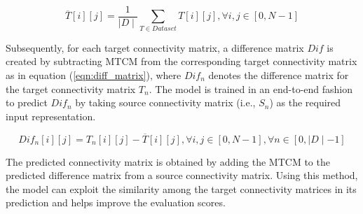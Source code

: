 
\vspace*{-\baselineskip}
\begin{equation}
\overline{T}[i][j]=\frac{1}{\mid D\mid}\sum_{T\in Dataset}T[i][j],\forall i,j\in[0,N-1]
\label{eqn:mtm}
\end{equation}

Subsequently, for each target connectivity matrix, a difference matrix $Dif$ is created by subtracting MTCM from the corresponding target connectivity matrix as in equation (\ref{eqn:diff_matrix}), where $Dif_n$ denotes the difference matrix for the target connectivity matrix $T_n$. The model is trained in an end-to-end fashion to predict $Dif_n$ by taking source connectivity matrix (i.e., $S_n$) as the required input representation.

\vspace*{-\baselineskip}
\begin{equation}
Dif_n[i][j]=T_n[i][j]-\overline{T}[i][j], \forall i,j\in[0,N-1], \forall n\in[0,\mid D\mid -1]
\label{eqn:diff_matrix}
\end{equation}

The predicted connectivity matrix is obtained by adding the MTCM to the predicted difference matrix from a source connectivity matrix. Using this method, the model can exploit the similarity among the target connectivity matrices in its prediction and helps improve the evaluation scores.










